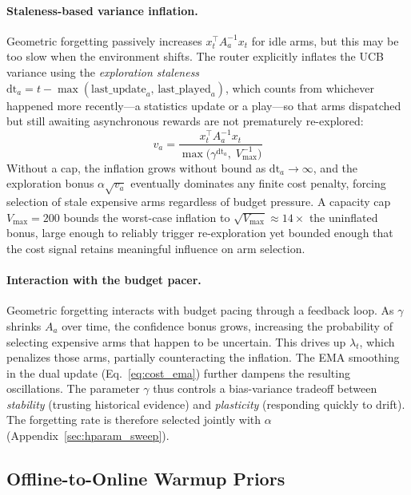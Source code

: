 \paragraph{Staleness-based variance inflation.}
Geometric forgetting passively increases $x_t^\top A_a^{-1} x_t$ for idle arms, but this may be too slow when the environment shifts. The router explicitly inflates the UCB variance using the \emph{exploration staleness} $\mathrm{dt}_a = t - \max(\text{last\_update}_a,\, \text{last\_played}_a)$, which counts from whichever happened more recently---a statistics update or a play---so that arms dispatched but still awaiting asynchronous rewards are not prematurely re-explored:
\begin{equation}
    v_a = \frac{x_t^\top A_a^{-1} x_t}{\max\!\bigl(\gamma^{\mathrm{dt}_a},\; V_{\max}^{-1}\bigr)}
    \label{eq:staleness_inflation}
\end{equation}
Without a cap, the inflation grows without bound as $\mathrm{dt}_a \to \infty$, and the exploration bonus $\alpha\sqrt{v_a}$ eventually dominates any finite cost penalty, forcing selection of stale expensive arms regardless of budget pressure. A capacity cap $V_{\max} = 200$ bounds the worst-case inflation to $\sqrt{V_{\max}} \approx 14{\times}$ the uninflated bonus, large enough to reliably trigger re-exploration yet bounded enough that the cost signal retains meaningful influence on arm selection.

\paragraph{Interaction with the budget pacer.}
Geometric forgetting interacts with budget pacing through a feedback loop. As $\gamma$ shrinks $A_a$ over time, the confidence bonus grows, increasing the probability of selecting expensive arms that happen to be uncertain. This drives up $\lambda_t$, which penalizes those arms, partially counteracting the inflation. The EMA smoothing in the dual update (Eq.~\ref{eq:cost_ema}) further dampens the resulting oscillations. The parameter $\gamma$ thus controls a bias-variance tradeoff between \emph{stability} (trusting historical evidence) and \emph{plasticity} (responding quickly to drift). The forgetting rate is therefore selected jointly with $\alpha$ (Appendix~\ref{sec:hparam_sweep}).

\subsection{Offline-to-Online Warmup Priors}
\label{sec:warmup}


